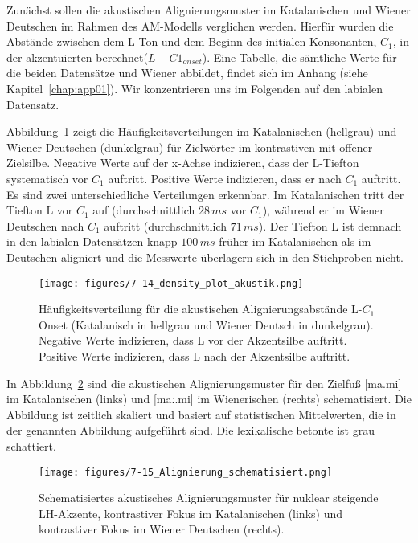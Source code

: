 Zunächst sollen die akustischen Alignierungsmuster im Katalanischen und Wiener Deutschen im Rahmen des AM-Modells verglichen werden. Hierfür wurden die Abstände zwischen dem L-Ton und dem Beginn des initialen Konsonanten, ${C}_{1}$, in der akzentuierten  berechnet(${L}-{C1}_{onset}$). Eine Tabelle, die sämtliche Werte für die beiden Datensätze  und Wiener  abbildet, findet sich im Anhang (siehe Kapitel~\ref{chap:app01}). Wir konzentrieren uns im Folgenden auf den labialen Datensatz.

Abbildung~\ref{figure:0714} zeigt die Häufigkeitsverteilungen im Katalanischen (hellgrau) und Wiener Deutschen (dunkelgrau) für Zielwörter im kontrastiven  mit offener Zielsilbe. Negative Werte auf der x-Achse indizieren, dass der L-Tiefton systematisch vor ${C}_{1}$ auftritt. Positive Werte indizieren, dass er nach ${C}_{1}$ auftritt. Es sind zwei unterschiedliche Verteilungen erkennbar. Im Katalanischen tritt der Tiefton L vor ${C}_{1}$ auf (durchschnittlich $28\,ms$ vor ${C}_{1}$), während er im Wiener Deutschen nach ${C}_{1}$ auftritt (durchschnittlich $71\,ms$). Der Tiefton L ist demnach in den labialen Datensätzen knapp $100\,ms$ früher im Katalanischen als im Deutschen aligniert und die Messwerte überlagern sich in den Stichproben nicht.

\begin{figure}
	\texttt{[image: figures/7-14\_density\_plot\_akustik.png]}
	\caption{Häufigkeitsverteilung für die akustischen Alignierungsabstände L-${C}_{1}$ Onset (Katalanisch in hellgrau und Wiener Deutsch in dunkelgrau). Negative Werte indizieren, dass L vor der Akzentsilbe auftritt. Positive Werte indizieren, dass L nach der Akzentsilbe auftritt.}
	\label{figure:0714}
\end{figure}

In Abbildung~\ref{figure:0715} sind die akustischen Alignierungsmuster für den Zielfuß [ma.mi] im Katalanischen (links) und [maː.mi] im Wienerischen (rechts) schematisiert. Die Abbildung ist zeitlich skaliert und basiert auf statistischen Mittelwerten, die in der genannten Abbildung aufgeführt sind. Die lexikalische betonte  ist grau schattiert.

\begin{figure}
	\texttt{[image: figures/7-15\_Alignierung\_schematisiert.png]}
	\caption{Schematisiertes akustisches Alignierungsmuster für nuklear steigende LH-Akzente, kontrastiver Fokus im Katalanischen (links) und kontrastiver Fokus im Wiener Deutschen (rechts).}
	\label{figure:0715}
\end{figure}


